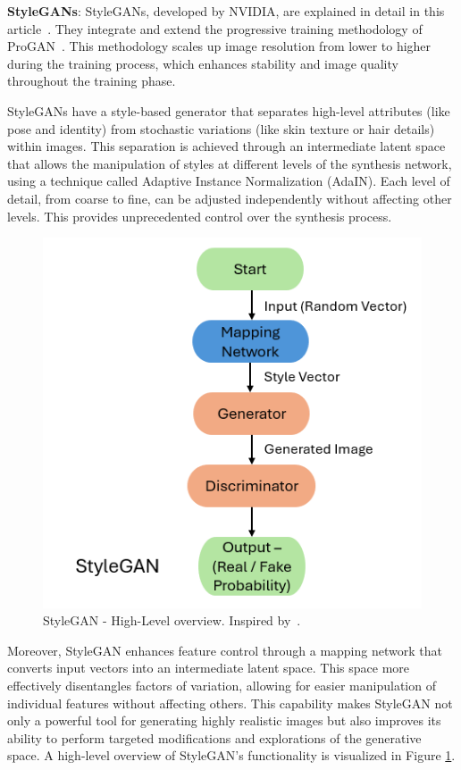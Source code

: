 \textbf{StyleGANs}: StyleGANs, developed by NVIDIA, are explained in detail in this article~\cite{StyleGAN}. They integrate and extend the progressive training methodology of ProGAN~\cite{ProGAN}. This methodology scales up image resolution from lower to higher during the training process, which enhances stability and image quality throughout the training phase. 

StyleGANs have a style-based generator that separates high-level attributes (like pose and identity) from stochastic variations (like skin texture or hair details) within images. This separation is achieved through an intermediate latent space that allows the manipulation of styles at different levels of the synthesis network, using a technique called Adaptive Instance Normalization (AdaIN). Each level of detail, from coarse to fine, can be adjusted independently without affecting other levels. This provides unprecedented control over the synthesis process.

\begin{figure}[!htb]
    \centering
    \includegraphics[scale=0.63]{Images/style-gan-high-level.png}
    \caption{StyleGAN - High-Level overview. Inspired by~\cite{StyleGANHighLevel}.}
    \label{fig:styleGANHighLevel}
\end{figure}

Moreover, StyleGAN enhances feature control through a mapping network that converts input vectors into an intermediate latent space. This space more effectively disentangles factors of variation, allowing for easier manipulation of individual features without affecting others. This capability makes StyleGAN not only a powerful tool for generating highly realistic images but also improves its ability to perform targeted modifications and explorations of the generative space. A high-level overview of StyleGAN's functionality is visualized in Figure \ref{fig:styleGANHighLevel}.

